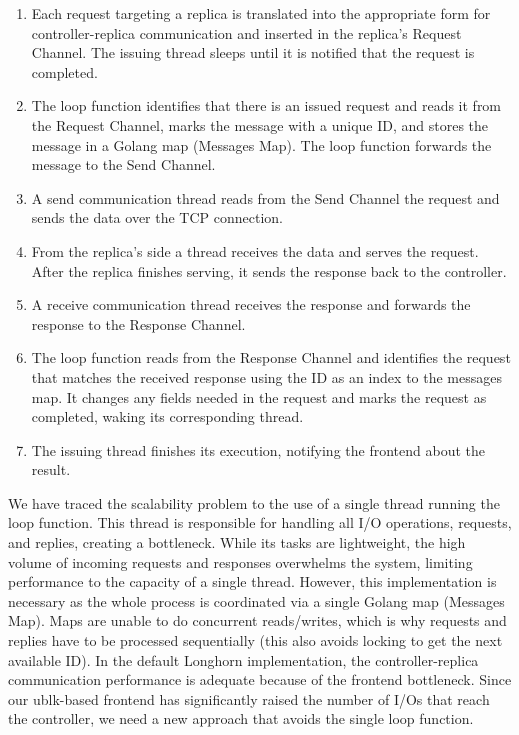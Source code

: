 \begin{enumerate}
\item Each request targeting a replica is translated into the appropriate form for controller-replica communication and inserted in the replica's Request Channel. The issuing thread sleeps until it is notified that the request is completed.
\item The loop function identifies that there is an issued request and reads it from the Request Channel, marks the message with a unique ID, and stores the message in a Golang map (Messages Map). The loop function forwards the message to the Send Channel. 
\item A send communication thread reads from the Send Channel the request and sends the data over the TCP connection.
\item From the replica's side a thread receives the data and serves the request. After the replica finishes serving, it sends the response back to the controller.
\item A receive communication thread receives the response and forwards the response to the Response Channel.
\item The loop function reads from the Response Channel and identifies the request that matches the received response using the ID as an index to the messages map. It changes any fields needed in the request and marks the request as completed, waking its corresponding thread.
\item The issuing thread finishes its execution, notifying the frontend about the result.
\end{enumerate}

We have traced the scalability problem to the use of a single thread running the loop function. This thread is responsible for handling all I/O operations, requests, and replies, creating a bottleneck. While its tasks are lightweight, the high volume of incoming requests and responses overwhelms the system, limiting performance to the capacity of a single thread. However, this implementation is necessary as the whole process is coordinated via a single Golang map (Messages Map). Maps are unable to do concurrent reads/writes, which is why requests and replies have to be processed sequentially (this also avoids locking to get the next available ID). In the default Longhorn implementation, the controller-replica communication performance is adequate because of the frontend bottleneck. Since our ublk-based frontend has significantly raised the number of I/Os that reach the controller, we need a new approach that avoids the single loop function.

